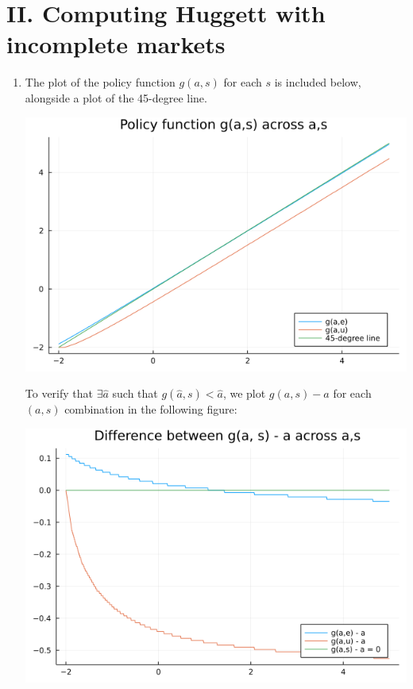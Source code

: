 \documentclass[12pt]{article}
\begin{document}
\section{II. Computing Huggett with incomplete markets} 
\begin{enumerate}[label=\alph*) ]
    \item The plot of the policy function $g(a,s)$ for each $s$ is included below, alongside a plot of the 45-degree line.
    \begin{center}
        \includegraphics[scale=0.5]{pfplot.png}
    \end{center}
    To verify that $\exists \hat{a}$ such that $g(\hat{a}, s) < \hat{a}$, we plot $g(a, s) - a$ for each $(a,s)$ combination in the following figure:
    \begin{center}
        \includegraphics[scale=0.5]{pfdiffplot.png}
    \end{center}

\end{enumerate}
\end{document}
